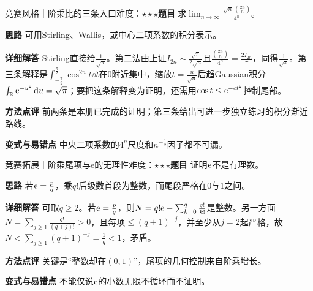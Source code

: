 \begin{example}{竞赛风格｜阶乘比的三条入口}{难度：$\star\star\star$}\label{deep:ex:limits_source_deep:stirlingcase}\textbf{题目} 求$\lim_{n\to\infty}\frac{\sqrt n\,\binom{2n}n}{4^n}$。\par\textbf{思路} 可用Stirling、Wallis，或中心二项系数的积分表示。\par\textbf{详细解答} Stirling直接给$\frac{1}{\sqrt\pi}$。第二法由上证$I_{2n}\sim\frac{\sqrt\pi}{2\sqrt n}$且$\frac{\binom{2n}n}{4^n}=\frac{2I_{2n}}{\pi}$，同得$\frac{1}{\sqrt\pi}$。第三条解释是$\int_{-\frac{\pi}{2}}^{\frac{\pi}{2}}\cos^{2n}t\dd t$在0附近集中，缩放$t=\frac{u}{\sqrt n}$后趋Gaussian积分$\int_{\mathbb{R}}\mathrm{e}^{-u^2}\mathop{}\!\mathrm{d} u=\sqrt\pi$；要把这条解释变为证明，还需用$\cos t\le\mathrm{e}^{-ct^2}$控制尾部。\par\textbf{方法点评} 前两条是本册已完成的证明；第三条给出可进一步独立练习的积分渐近路线。\par\textbf{变式与易错点} 中央二项系数的$4^n$尺度和$n^{-\frac{1}{2}}$因子都不可漏。\end{example}

\begin{example}{竞赛拓展｜阶乘尾项与e的无理性}{难度：$\star\star\star$}\label{deep:ex:limits_source_deep:eirrat}\textbf{题目} 证明$\mathrm{e}$不是有理数。\par\textbf{思路} 若$\mathrm{e}=\frac{p}{q}$，乘$q!$后级数首段为整数，而尾段严格在0与1之间。\par\textbf{详细解答} 可取$q\ge2$。若$\mathrm{e}=\frac{p}{q}$，则$N=q!\mathrm{e}-\sum_{k=0}^q\frac{q!}{k!}$是整数。另一方面$N=\sum_{j\ge1}\frac{q!}{(q+j)!}>0$，且每项$\le(q+1)^{-j}$，并至少从$j=2$起严格，故$N<\sum_{j\ge1}(q+1)^{-j}=\frac{1}{q}<1$，矛盾。\par\textbf{方法点评} 关键是“整数却在$(0,1)$”，尾项的几何控制来自阶乘增长。\par\textbf{变式与易错点} 不能仅说$\mathrm{e}$的小数无限不循环而不证明。\end{example}
